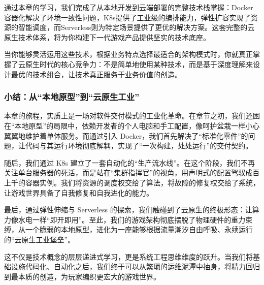 通过本章的学习，我们完成了从本地开发到云端部署的完整技术栈掌握：Docker容器化解决了环境一致性问题，K8s提供了工业级的编排能力，弹性扩容实现了资源的智能调度，而Serverless则为特定场景提供了更优的解决方案。这套完整的云原生技术体系，将为你构建下一代游戏产品提供坚实的技术底座。

当你能够灵活运用这些技术，根据业务特点选择最适合的架构模式时，你就真正掌握了云原生时代的核心竞争力：不是简单地使用某种技术，而是基于深度理解来设计最优的技术组合，让技术真正服务于业务价值的创造。


\subsubsection{小结：从“本地原型”到“云原生工业”}

本章的旅程，实质上是一场对软件交付模式的工业化革命。在章节之初，我们还困在“本地原型”的局限中，依赖开发者的个人电脑和手工配置，像呵护盆栽一样小心翼翼地维护着单体服务。而通过引入 Docker，我们首先解决了“标准化零件”的问题，让代码与其运行环境彻底解耦，实现了“一次构建，处处运行”的交付契约。

随后，我们通过 K8s 建立了一套自动化的“生产流水线”。在这个阶段，我们不再关注单台服务器的死活，而是站在“集群指挥官”的视角，用声明式的配置驾驭成百上千的容器实例。我们将资源的调度权交给了算法，将故障的修复权交给了系统，让游戏世界具备了自我修复和自我进化的能力。

最后，通过弹性伸缩与 Serverless 的探索，我们触碰到了云原生的终极形态：让算力像水电一样“即开即用”。至此，我们的游戏架构彻底摆脱了物理硬件的重力束缚，从一个脆弱的本地原型，进化为一座能够根据流量潮汐自由呼吸、永续运行的“云原生工业堡垒”。

这不仅是技术概念的层层递进式学习，更是系统工程思维维度的跃升。当我们将基础设施代码化、自动化之后，我们终于可以从繁琐的运维泥潭中抽身，将精力回归到最本质的创造，为玩家编织更宏大的游戏世界。

\newpage